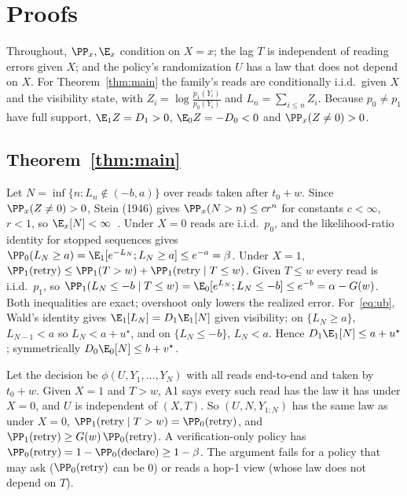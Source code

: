 \section{Proofs}
\label{app:proofs}

Throughout, $\PP_x,\E_x$ condition on $X{=}x$; the lag $T$ is independent of reading errors given $X$; and the policy's randomization $U$ has a law that does not depend on $X$.
For Theorem~\ref{thm:main} the family's reads are conditionally i.i.d.\ given $X$ and the visibility state, with $Z_i=\log\frac{p_1(Y_i)}{p_0(Y_i)}$ and $L_n=\sum_{i\le n}Z_i$.
Because $p_0\ne p_1$ have full support, $\E_1Z=D_1>0$, $\E_0Z=-D_0<0$ and $\PP_x(Z\ne0)>0$.

\subsection{Theorem~\ref{thm:main}}
 Let $N=\inf\{n:L_n\notin(-b,a)\}$ over reads taken after $t_0+w$. Since $\PP_x(Z\neq0)>0$, Stein (1946) gives $\PP_x(N>n)\le cr^n$ for constants $c<\infty$, $r<1$, so
$\E_x[N]<\infty$~\cite{tartakovsky2014sequential}. Under $X{=}0$ reads are i.i.d.\ $p_0$, and the likelihood-ratio identity for stopped sequences gives
$\PP_0(L_N\ge a)=\E_1[e^{-L_N};L_N\ge a]\le e^{-a}=\beta$. Under $X{=}1$,
$\PP_1(\text{retry})\le\PP_1(T>w)+\PP_1(\text{retry}\mid T\le w)$. Given $T\le w$ every read is i.i.d.\ $p_1$, so $\PP_1(L_N\le-b\mid T\le w)=\E_0[e^{L_N};L_N\le-b]\le e^{-b}=\alpha-G(w)$.
Both inequalities are exact; overshoot only lowers the realized error. For~\eqref{eq:ub}, Wald's identity gives $\E_1[L_N]=D_1\E_1[N]$ given visibility; on $\{L_N\ge a\}$,
$L_{N-1}<a$ so $L_N<a+u^\star$, and on $\{L_N\le-b\}$, $L_N<a$. Hence $D_1\E_1[N]\le a+u^\star$; symmetrically $D_0\E_0[N]\le b+v^\star$.

 Let the decision be $\phi(U,Y_1,\dots,Y_N)$ with all reads end-to-end and taken by $t_0+w$. Given $X{=}1$ and $T>w$, A1 says every such read has the law it has under $X{=}0$,
and $U$ is independent of $(X,T)$. So $(U,N,Y_{1:N})$ has the same law as under $X{=}0$, $\PP_1(\text{retry}\mid T>w)=\PP_0(\text{retry})$, and
$\PP_1(\text{retry})\ge G(w)\,\PP_0(\text{retry})$. A verification-only policy has $\PP_0(\text{retry})=1-\PP_0(\text{declare})\ge1-\beta$. The argument fails for a policy that may ask
($\PP_0(\text{retry})$ can be 0) or reads a hop-1 view (whose law does not depend on $T$).

